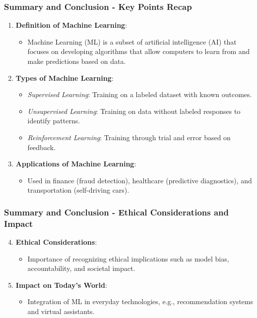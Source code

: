 \documentclass[aspectratio=169]{beamer}
\begin{document}
\begin{frame}[fragile]
    \frametitle{Summary and Conclusion - Key Points Recap}
    \begin{enumerate}
        \item \textbf{Definition of Machine Learning}: 
        \begin{itemize}
            \item Machine Learning (ML) is a subset of artificial intelligence (AI) that focuses on developing algorithms that allow computers to learn from and make predictions based on data. 
        \end{itemize}
        
        \item \textbf{Types of Machine Learning}:
        \begin{itemize}
            \item \textit{Supervised Learning}: Training on a labeled dataset with known outcomes.
            \item \textit{Unsupervised Learning}: Training on data without labeled responses to identify patterns.
            \item \textit{Reinforcement Learning}: Training through trial and error based on feedback.
        \end{itemize}
        
        \item \textbf{Applications of Machine Learning}:
        \begin{itemize}
            \item Used in finance (fraud detection), healthcare (predictive diagnostics), and transportation (self-driving cars).
        \end{itemize}
    \end{enumerate}
\end{frame}

\begin{frame}[fragile]
    \frametitle{Summary and Conclusion - Ethical Considerations and Impact}
    \begin{enumerate}
        \setcounter{enumi}{3}
        \item \textbf{Ethical Considerations}:
        \begin{itemize}
            \item Importance of recognizing ethical implications such as model bias, accountability, and societal impact.
        \end{itemize}

        \item \textbf{Impact on Today’s World}:
        \begin{itemize}
            \item Integration of ML in everyday technologies, e.g., recommendation systems and virtual assistants.
        \end{itemize}
    \end{enumerate}
\end{frame}
\end{document}
